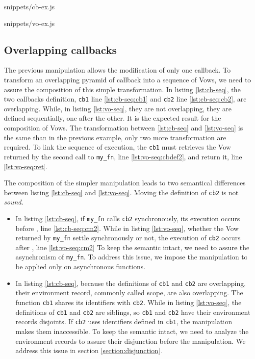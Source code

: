              {snippets/cb-ex.js}

             {snippets/vo-ex.js}

\subsection{Overlapping callbacks} \label{section:overlapping-callbacks}

The previous manipulation allows the modification of only one callback.
To transform an overlapping pyramid of callback into a sequence of Vows, we need to assure the composition of this simple transformation.
In listing \ref{lst:cb-seq}, the two callbacks definition, \texttt{cb1} line \ref{lst:cb-seq:cb1} and \texttt{cb2} line \ref{lst:cb-seq:cb2}, are overlapping.
While, in listing \ref{lst:vo-seq}, they are not overlapping, they are defined sequentially, one after the other.
It is the expected result for the composition of Vows.
The transformation between \ref{lst:cb-seq} and \ref{lst:vo-seq} is the same than in the previous example, only two more transformation are required.
To link the sequence of execution, the \texttt{cb1} must retrieves the Vow returned by the second call to \texttt{my_fn}, line \ref{lst:vo-seq:cbdef2}, and return it, line \ref{lst:vo-seq:ret}.

The composition of the simpler manipulation leads to two semantical differences between listing \ref{lst:cb-seq} and \ref{lst:vo-seq}.
Moving the definition of \texttt{cb2} is not \textit{sound}.
\begin{itemize}
\item In listing \ref{lst:cb-seq}, if \texttt{my\_fn} calls \texttt{cb2} synchronously, its execution occurs before , line \ref{lst:cb-seq:cm2}.
While in listing \ref{lst:vo-seq}, whether the Vow returned by \texttt{my\_fn} settle synchronously or not, the execution of \texttt{cb2} occurs after , line \ref{lst:vo-seq:cm2}
To keep the semantic intact, we need to assure the asynchronism of \texttt{my\_fn}.
To address this issue, we impose the manipulation to be applied only on asynchronous functions.
\item In listing \ref{lst:cb-seq}, because the definitions of \texttt{cb1} and \texttt{cb2} are overlapping, their environment record, commonly called scope, are also overlapping.
The function \texttt{cb1} shares its identifiers with \texttt{cb2}.
While in listing \ref{lst:vo-seq}, the definitions of \texttt{cb1} and \texttt{cb2} are siblings, so \texttt{cb1} and \texttt{cb2} have their environment records disjoints.
If \texttt{cb2} uses identifiers defined in \texttt{cb1}, the manipulation makes them inaccessible.
To keep the semantic intact, we need to analyze the environment records to assure their disjunction before the manipulation. 
We address this issue in section \ref{section:disjunction}.
\end{itemize}

